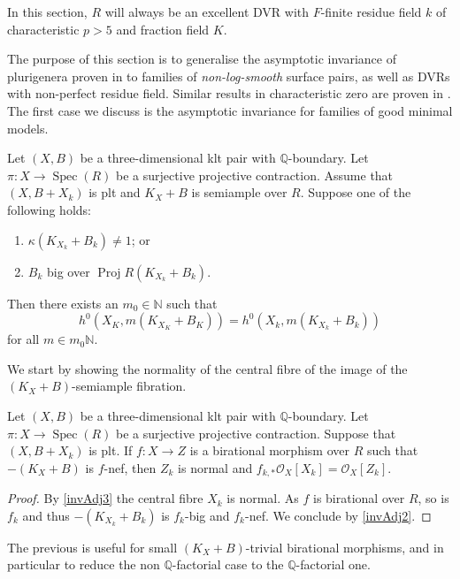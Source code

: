 \documentclass[a4paper,12pt]{book}
\DeclareMathOperator{\Spec}{Spec}
\DeclareMathOperator{\Proj}{Proj}
\newcommand{\bN}{\mathbb{N}}
\newcommand{\ox}{\mathcal{O}_{X}}
\begin{document}
	
	In this section, $R$ will always be an excellent DVR with $F$-finite residue field $k$ of characteristic $p>5$ and fraction field $K$. 
	
	The purpose of this section is to generalise the asymptotic invariance of plurigenera proven in \cite[Theorem 3.1]{EH} to families of \emph{non-log-smooth} surface pairs, as well as DVRs with non-perfect residue field. Similar results in characteristic zero are proven in \cite{HMX13, HMX18}.
	The first case we discuss is the asymptotic invariance for families of good minimal models.
	\begin{theorem}\label{thm:ADIOP_SA}
		Let $(X,B)$ be a three-dimensional klt pair with $\mathbb{Q}$-boundary.
		Let $\pi \colon X \to\Spec (R)$ be a  surjective projective contraction. Assume that $(X,B+X_k)$ is plt and $K_X+B$ is semiample over $R$.
		Suppose one of the following holds:
		\begin{enumerate}
			\item $\kappa(K_{X_k}+B_k)\neq 1$; or
			\item  $B_k$ big over $\Proj R(K_{X_k}+B_k)$.
		\end{enumerate} 
		Then there exists an $m_{0} \in \mathbb{N}$ such that 
		$$h^0(X_K,m(K_{X_K}+B_K))=h^0(X_k,m(K_{X_k}+B_k))$$
		for all $m\in m_0\bN$.
	\end{theorem}
	
	We start by showing the normality of the central fibre of the image of the $(K_X+B)$-semiample fibration.
	
	\begin{proposition}\label{p-gen-case}
		Let $(X,B)$ be a three-dimensional klt pair with $\mathbb{Q}$-boundary.
		Let $\pi \colon X \to\Spec (R)$ be a  surjective projective contraction.
		Suppose that $(X,B+X_{k})$ is plt. If $f \colon X \to Z$ is a birational morphism over $R$ such that $-(K_{X}+B)$ is $f$-nef, then $Z_k$ is normal and $f_{k,*}\ox[X_{k}]=\ox[Z_{k}]$.
	\end{proposition}
	
	\begin{proof}
		By \autoref{invAdj3} the central fibre $X_{k}$ is normal. 
		As $f$ is birational over $R$, so is $f_{k}$ and thus $-(K_{X_{k}}+B_{k})$ is $f_{k}$-big and $f_k$-nef. We conclude by \autoref{invAdj2}.
	\end{proof}
	
	The previous is useful for small $(K_{X}+B)$-trivial birational morphisms, and in particular to reduce the non $\mathbb{Q}$-factorial case to the $\mathbb{Q}$-factorial one.
	
\end{document}
